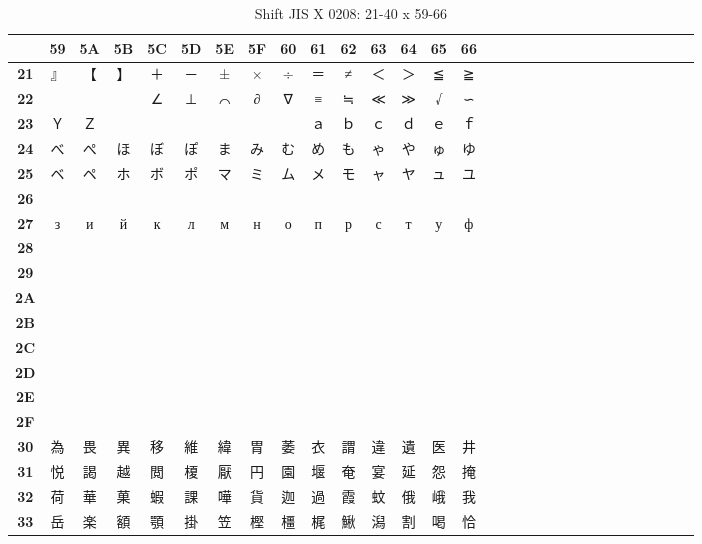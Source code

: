 \begin{table}[H]
\centering
\caption{Shift JIS X 0208: 21-40 x 59-66}
\begin{tabular}{|Sc|Sc|Sc|Sc|Sc|Sc|Sc|Sc|Sc|Sc|Sc|Sc|Sc|Sc|Sc|}
\hline
 & \textbf{59} & \textbf{5A} & \textbf{5B} & \textbf{5C} & \textbf{5D} & \textbf{5E} & \textbf{5F} & \textbf{60} & \textbf{61} & \textbf{62} & \textbf{63} & \textbf{64} & \textbf{65} & \textbf{66} \\ \hline
\textbf{21} & 』 & 【 & 】 & ＋ & － & ± & × & ÷ & ＝ & ≠ & ＜ & ＞ & ≦ & ≧ \\ \hline
\textbf{22} &   &   &   & ∠ & ⊥ & ⌒ & ∂ & ∇ & ≡ & ≒ & ≪ & ≫ & √ & ∽ \\ \hline
\textbf{23} & Ｙ & Ｚ &   &   &   &   &   &   & ａ & ｂ & ｃ & ｄ & ｅ & ｆ \\ \hline
\textbf{24} & べ & ぺ & ほ & ぼ & ぽ & ま & み & む & め & も & ゃ & や & ゅ & ゆ \\ \hline
\textbf{25} & ベ & ペ & ホ & ボ & ポ & マ & ミ & ム & メ & モ & ャ & ヤ & ュ & ユ \\ \hline
\textbf{26} &  &  &  &  &  &  &  &  &  &  &  &  &  &  \\ \hline
\textbf{27} & з & и & й & к & л & м & н & о & п & р & с & т & у & ф \\ \hline
\textbf{28} &  &  &  &  &  &  &  &  &  &  &  &  &  &  \\ \hline
\textbf{29} &  &  &  &  &  &  &  &  &  &  &  &  &  &  \\ \hline
\textbf{2A} &  &  &  &  &  &  &  &  &  &  &  &  &  &  \\ \hline
\textbf{2B} &  &  &  &  &  &  &  &  &  &  &  &  &  &  \\ \hline
\textbf{2C} &  &  &  &  &  &  &  &  &  &  &  &  &  &  \\ \hline
\textbf{2D} &  &  &  &  &  &  &  &  &  &  &  &  &  &  \\ \hline
\textbf{2E} &  &  &  &  &  &  &  &  &  &  &  &  &  &  \\ \hline
\textbf{2F} &  &  &  &  &  &  &  &  &  &  &  &  &  &  \\ \hline
\textbf{30} & 為 & 畏 & 異 & 移 & 維 & 緯 & 胃 & 萎 & 衣 & 謂 & 違 & 遺 & 医 & 井 \\ \hline
\textbf{31} & 悦 & 謁 & 越 & 閲 & 榎 & 厭 & 円 & 園 & 堰 & 奄 & 宴 & 延 & 怨 & 掩 \\ \hline
\textbf{32} & 荷 & 華 & 菓 & 蝦 & 課 & 嘩 & 貨 & 迦 & 過 & 霞 & 蚊 & 俄 & 峨 & 我 \\ \hline
\textbf{33} & 岳 & 楽 & 額 & 顎 & 掛 & 笠 & 樫 & 橿 & 梶 & 鰍 & 潟 & 割 & 喝 & 恰 \\ \hline

\end{tabular}
\end{table}
